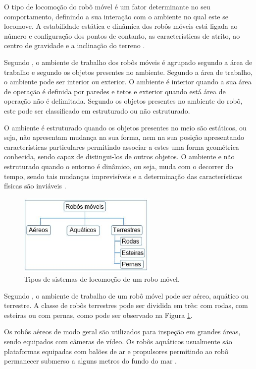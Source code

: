 O tipo de locomoção do robô móvel é um fator determinante no seu comportamento, definindo a sua interação com o ambiente no qual
este se locomove. A estabilidade estática e dinâmica dos robôs móveis está ligada ao número e configuração dos pontos de contanto,
as características de atrito, ao centro de gravidade e a inclinação do terreno \cite{silva:2010}.

Segundo , o ambiente de trabalho dos robôs móveis é agrupado segundo a área de trabalho e segundo os objetos
presentes no ambiente. Segundo a área de trabalho, o ambiente pode ser interior ou exterior. O ambiente é interior quando a sua
área de operação é definida por paredes e tetos e exterior quando está área de operação não é delimitada. Segundo os objetos
presentes no ambiente do robô, este pode ser classificado em estruturado ou não estruturado.

O ambiente é estruturado quando os objetos presentes no meio são estáticos, ou seja, não apresentam mudança na sua forma, nem na
sua posição apresentando características particulares permitindo associar a estes uma forma geométrica conhecida, sendo capaz de
distingui-los de outros objetos. O ambiente e não estruturado quando o entorno é dinâmico, ou seja, muda com o decorrer do
tempo, sendo tais mudanças imprevisíveis e a determinação das características físicas são inviáveis \cite{secchi:2008}.

\begin{figure}[H]
    \centering
    \includegraphics[width=0.6\textwidth]{figuras/locomocao.eps}
    \caption{Tipos de sistemas de locomoção de um robo móvel.}
    \label{fig:locomocao}
\end{figure}

Segundo , o ambiente de trabalho de um robô móvel pode ser aéreo, aquático ou terrestre. A classe de robôs
terrestres pode ser dividida em três: com rodas, com esteiras ou com pernas, como pode ser observado na Figura \ref{fig:locomocao}.

Os robôs aéreos de modo geral são utilizados para inspeção em grandes áreas, sendo equipados com câmeras de vídeo.  Os robôs aquáticos
usualmente são plataformas equipadas com balões de ar e propulsores permitindo ao robô permanecer submerso a alguns metros do fundo do
mar \cite{pieri:2002}.

